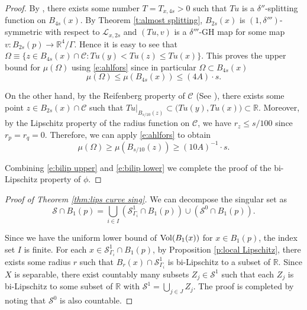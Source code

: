 \documentclass[11pt,reqno]{amsart}
\numberwithin{equation}{section}
\newcommand{\RR}{\mathds{R}}
\newcommand{\Vol}{{\rm Vol}}
\newcommand{\cC}{\mathcal{C}}
\newcommand{\cL}{\mathcal{L}}
\newcommand{\cS}{\mathcal{S}}
\theoremstyle{definition}
\theoremstyle{remark}
\begin{document}
\begin{proof}
By \cite[Theorem 7.2]{cjn}, there exists some number $T=T_{x,4s}>0$ such that $Tu$ is a $\delta''$-splitting function on $B_{4s}(x)$. By Theorem \ref{t:almost splitting}, $B_{2s}(x)$ is $(1,\delta''')$-symmetric with respect to $\cL_{x,2s}$ and $(Tu,v)$ is a $\delta'''$-GH map for some map $v :B_{2s}(p) \to \RR^4/\Gamma$. Hence it is easy to see that $\Omega \equiv \{z\in B_{4s}(x) \cap \cC : Tu(y) < Tu(z) \le Tu(x)\}$. This proves the upper bound for $\mu(\Omega)$ using \eqref{e:ahlfors} since in particular $\Omega \subset B_{4s}(x)$
\begin{equation}\label{e:bilip upper}
    \mu(\Omega) \le \mu(B_{4s}(x)) \le (4A)\cdot s.
\end{equation}


On the other hand, by the Reifenberg property of $\cC$ (See \cite[Definition 3.1 (n3)]{jn}), there exists some point $z\in B_{2s}(x) \cap \cC$ such that $Tu|_{B_{s/10}(z)} \subset \big(Tu(y), Tu(x) \big) \subset \RR$. Moreover, by the Lipschitz property of the radius function on $\cC$, we have $r_z \le s/100$ since $r_p = r_q =0$. Therefore,  we can apply \eqref{e:ahlfors} to obtain
\begin{equation}\label{e:bilip lower}
    \mu(\Omega) \ge \mu(B_{s/10}(z)) \ge (10A)^{-1} \cdot s.
\end{equation}

Combining \eqref{e:bilip upper} and \eqref{e:bilip lower} we complete the proof of the bi-Lipschitz property of $\phi$.

\end{proof}









\begin{proof}[Proof of Theorem \ref{thm:lips curve sing}]
    We can decompose the singular set as
    \begin{equation*}
        \cS \cap B_1(p) = \bigcup_{i \in I} (\cS^1_{\Gamma_i} \cap B_1(p)) \cup (\cS^0 \cap B_1(p)).
    \end{equation*}

Since we have the uniform lower bound of $\Vol(B_1(x))$ for $x\in B_1(p)$, the index set $I$ is finite. For each $x \in \cS^1_{\Gamma_i} \cap B_1(p)$, by Proposition \ref{p:local Lipschitz}, there exists some radius $r$ such that $B_{r}(x) \cap \cS^1_{\Gamma_i}$ is bi-Lipschitz to a subset of $\RR$. Since $X$ is separable, there exist countably many subsets $Z_j \in \cS^1$ such that each $Z_j$ is bi-Lipschitz to some subset of $\RR$ with $\cS^1 = \bigcup_{j \in J}Z_j$. The proof is completed by noting that $\cS^0$ is also countable.   
\end{proof}
\end{document}
